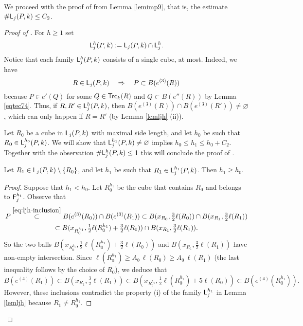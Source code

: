 

\vvv
We proceed with the proof of  from Lemma \ref{lemimp9}, that is, the estimate $\#{\mathsf{L}}_j(P,k) \leq C_2$.
\begin{proof}[Proof of ]

For $h\ge 1$ set
\begin{equation*}
{\mathsf{L}}_j^{h}(P,k):= {\mathsf{L}}_j(P,k)\cap {\mathsf{L}}_j^{h}.
\end{equation*}
Notice that each family ${\mathsf{L}}_j^h(P,k)$ consists of a single cube, at most.
Indeed, we have
\begin{equation}\label{eq:ljh-inclusion}
R\in{\mathsf{L}}_j(P,k)\quad\Rightarrow\quad P\subset B(e^{(3)}(R))
\end{equation}
because $P\in e'(Q)$ for some $Q\in{\mathsf{Trc}}_k(R)$ and $Q\subset B(e''(R))$ by Lemma \ref{eqtec74}. Thus, if $R,R'\in{\mathsf{L}}_j^h(P,k)$,
then $B(e^{(3)}(R))\cap B(e^{(3)}(R'))\neq\varnothing$, which can only happen if $R=R'$ (by Lemma \ref{lemljh} (ii)).

Let $R_0$ be a cube in ${\mathsf{L}}_j(P,k)$ with maximal side length, and let $h_0$ be such that $R_0\in {\mathsf{L}}_j^{h_0}(P,k)$. We will show that ${\mathsf{L}}_j^{h_1}(P,k)\neq\varnothing$ implies $h_0\le h_1\le h_0+C_2$. Together with the observation $\#{\mathsf{L}}_j^h(P,k)\le 1$ this will conclude the proof of .

\begin{claim}
Let $R_1\in{\mathsf{L}}_j(P,k)\setminus\{R_0\}$, and let $h_1$ be such that $R_1\in {\mathsf{L}}_j^{h_1}(P,k)$. 
Then $h_1\geq h_0$.
\end{claim}

\begin{proof}
Suppose that $h_1< h_0$.
Let $R_0^{h_1}$ be the cube that contains $R_0$ and belongs to
${\mathsf{F}}_j^{h_1}$. Observe that
\begin{multline*}
P \overset{ \eqref{eq:ljh-inclusion}}{\subset}  B(e^{(3)}(R_0)) \cap B(e^{(3)}(R_1)) \subset B(x_{R_0},\tfrac32\ell(R_0)) \cap
B(x_{R_1},\tfrac32\ell(R_1))\\
 \subset B(x_{R_0^{h_1}},\tfrac12\ell(R^{h_1}_0) + \tfrac32\ell(R_0)) \cap
B(x_{R_1},\tfrac32\ell(R_1)).
\end{multline*}
So the two balls $B(x_{R_0^{h_1}},\tfrac12\ell(R^{h_1}_0) + \tfrac32\ell(R_0))$ and 
$B(x_{R_1},\tfrac32\ell(R_1))$ have non-empty intersection. Since $\ell(R_0^{h_1})\ge A_0\,\ell(R_0)\ge A_0\,\ell(R_1)$ (the last inequality follows by the choice of $R_0$), we deduce that
\begin{equation*}
B(e^{(4)}(R_1))\subset B(x_{R_1},\tfrac32\ell(R_1)) \subset B(x_{R_0^{h_1}},\tfrac12\ell(R^{h_1}_0) + 5\ell(R_0))
\subset B(e^{(4)}(R_0^{h_1})).
\end{equation*}
However, these inclusions contradict the property (i) of the family ${\mathsf{L}}_j^{h_1}$ in Lemma 
\ref{lemljh} because $R_1\neq R_0^{h_1}$.
\end{proof}


\end{proof}
